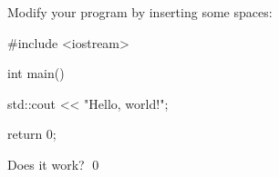 Modify your program by inserting some spaces:
\begin{console}
#include <iostream>

int main()
{
    std::cout            << "Hello, world!\n";

    return 0;
}
\end{console}
Does it work?
\qed
